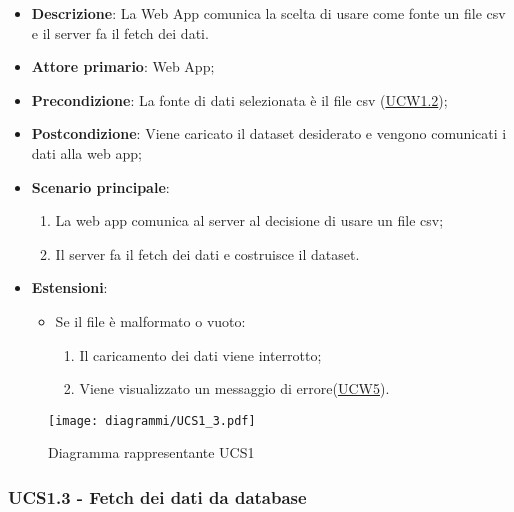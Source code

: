 \begin{itemize}

	\item \textbf{Descrizione}: La Web App comunica la scelta di usare come fonte un file csv e il server fa il fetch dei dati.

	\item \textbf{Attore primario}: Web App;

	\item \textbf{Precondizione}:   La fonte di dati selezionata è il file csv (\hyperref[ssub:ucw1.2]{UCW1.2});

	\item \textbf{Postcondizione}:  Viene caricato il dataset desiderato  e vengono comunicati i dati alla web app;

	\item \textbf{Scenario principale}:
	      \begin{enumerate}
		      \item La web app comunica al server al decisione di usare un file csv;
		      \item Il server fa il fetch dei dati e costruisce il dataset.
	      \end{enumerate}

	\item \textbf{Estensioni}:
	      \begin{itemize}

		      \item Se il file è malformato o vuoto:
		            \begin{enumerate}

			            \item Il caricamento dei dati viene interrotto;
			            \item Viene visualizzato un messaggio di errore(\hyperref[sub:ucw5]{UCW5}).

		            \end{enumerate}

	      \end{itemize}

\end{itemize}

\begin{figure}[h]
	\centering
	\texttt{[image: diagrammi/UCS1\_3.pdf]}
	\caption{Diagramma rappresentante UCS1}
	\label{fig:UCS1_3}
\end{figure}

\subsubsection{UCS1.3 - Fetch dei dati da database}
\label{ssub:ucs1.3}

